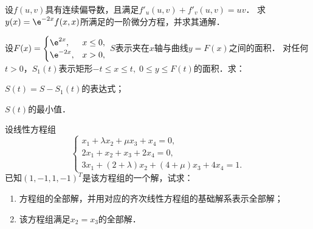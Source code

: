 \documentclass[plain,noanswer,medmath]{../../template/jnuexam}
\begin{document}














\begin{problem}[points=8]
设$f(u,v)$具有连续偏导数，且满足$f'_u(u,v) + f'_v(u,v) = uv$．
求$y(x) = \e^{- 2x} f(x,x)$所满足的一阶微分方程，并求其通解．
\end{problem}




\begin{problem}[points=9]
设$F(x) = \begin{cases}
    \e^{2x}, & x \le 0, \\
  \e^{- 2x}, & x > 0,
\end{cases}$ $S$表示夹在$x$轴与曲线$y = F(x)$之间的面积．
对任何$t > 0$，$S_1(t)$表示矩形$- t \le x \le t,\;0 \le y \le F(t)$的面积．求：\par
\begin{enumerate*}
\item $S(t) = S - S_1(t)$的表达式；
\item $S(t)$的最小值．
\end{enumerate*}
\end{problem}


\begin{problem}[points=13]
设线性方程组
$$\begin{cases}
  x_1 + \lambda x_2 + \mu x_3 + x_4 = 0, \\
  2x_1 + x_2 + x_3 + 2x_4 = 0, \\
  3x_1 + (2 + \lambda)x_2 + (4 + \mu)x_3 + 4x_4 = 1.
\end{cases}$$
已知$(1, - 1,1, - 1)^T$是该方程组的一个解，试求：
\begin{enumerate}
\item 方程组的全部解，并用对应的齐次线性方程组的基础解系表示全部解；
\item 该方程组满足$x_2 = x_3$的全部解．
\end{enumerate}
\end{problem}
\end{document}
